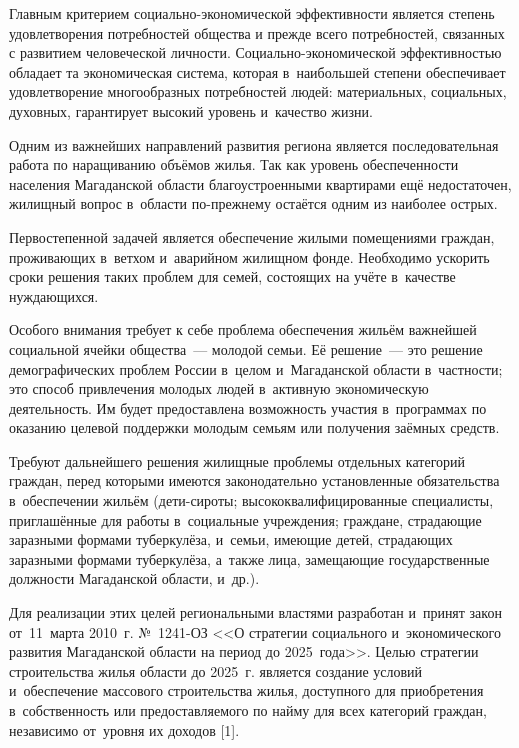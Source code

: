 



\makeProcTitle
{}

Главным критерием социально-экономической эффективности является степень удовлетворения потребностей общества и прежде всего потребностей, связанных с развитием человеческой личности. Социально-экономической эффективностью обладает та экономическая система, которая в~наибольшей степени обеспечивает удовлетворение многообразных потребностей людей: материальных, социальных, духовных, гарантирует высокий уровень и~качество жизни.

Одним из важнейших направлений развития региона является последовательная работа по наращиванию объёмов жилья. Так как уровень обеспеченности населения Магаданской области благоустроенными квартирами ещё недостаточен, жилищный вопрос в~области по-прежнему остаётся одним из наиболее острых.

Первостепенной задачей является обеспечение жилыми помещениями граждан, проживающих в~ветхом и~аварийном жилищном фонде. Необходимо ускорить сроки решения таких проблем для семей, состоящих на учёте в~качестве нуждающихся.

Особого внимания требует к себе проблема обеспечения жильём важнейшей социальной ячейки общества~--- молодой семьи. Её решение~--- это решение демографических проблем России в~целом и~Магаданской области в~частности; это способ привлечения молодых людей в~активную экономическую деятельность. Им будет предоставлена возможность участия в~программах по оказанию целевой поддержки молодым семьям или получения заёмных средств.

Требуют дальнейшего решения жилищные проблемы отдельных категорий граждан, перед которыми имеются законодательно установленные обязательства в~обеспечении жильём (дети-сироты; высококвалифицированные специалисты, приглашённые для работы в~социальные учреждения; граждане, страдающие заразными формами туберкулёза, и~семьи, имеющие детей, страдающих заразными формами туберкулёза, а~также лица, замещающие государственные должности Магаданской области, и~др.).

Для реализации этих целей региональными властями разработан и~принят закон от~11~марта 2010~г. №~1241-ОЗ <<О стратегии социального и~экономического развития Магаданской области на период до 2025~года>>. Целью стратегии строительства жилья области до 2025~г. является создание условий и~обеспечение массового строительства жилья, доступного для приобретения в~собственность или предоставляемого по найму для всех категорий граждан, независимо от~уровня их доходов [1].

